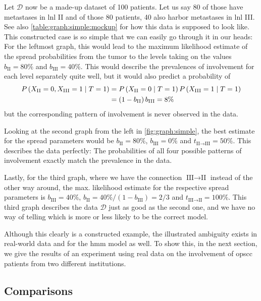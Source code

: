 \documentclass[\relativeRoot/main.tex]{subfiles}
\begin{document}
Let $\boldsymbol{\mathcal{D}}$ now be a made-up dataset of 100 patients. Let us say 80 of those have metastases in \gls{lnl} II and of those 80 patients, 40 also harbor metastases in \gls{lnl} III. See also \cref{table:graph:simple:mockup} for how this data is supposed to look like. This constructed case is so simple that we can easily go through it in our heads: For the leftmost graph, this would lead to the maximum likelihood estimate of the spread probabilities from the tumor to the levels taking on the values $b_\text{II} = 80\%$ and $b_\text{III} = 40\%$. This would describe the prevalences of involvement for each level separately quite well, but it would also predict a probability of
%
\begin{equation}
    \begin{aligned}
        P \left( X_\text{II}=0, X_\text{III}=1 \mid T=1 \right) &= P \left( X_\text{II}=0 \mid T=1 \right) P \left( X_\text{III}=1 \mid T=1 \right) \\
        &= \left( 1 - b_\text{II} \right) b_\text{III} = 8\%
    \end{aligned}
\end{equation}
%
but the corresponding pattern of involvement is never observed in the data.

Looking at the second graph from the left in \cref{fig:graph:simple}, the best estimate for the spread parameters would be $b_\text{II} = 80\%$, $b_\text{III} = 0\%$ and $t_{\text{II} \rightarrow \text{III}} = 50\%$. This describes the data perfectly: The probabilities of all four possible patterns of involvement exactly match the prevalence in the data.

Lastly, for the third graph, where we have the connection $\text{III} \rightarrow \text{II}$ instead of the other way around, the max. likelihood estimate for the respective spread parameters is $b_\text{III} = 40\%$, $b_\text{II} = 40\% / (1 - b_\text{III}) = 2/3$ and $t_{\text{III} \rightarrow \text{II}} = 100\%$. This third graph describes the data $\boldsymbol{\mathcal{D}}$ just as good as the second one, and we have no way of telling which is more or less likely to be the correct model.

Although this clearly is a constructed example, the illustrated ambiguity exists in real-world data and for the \gls{hmm} model as well. To show this, in the next section, we give the results of an experiment using real data on the involvement of \gls{opscc} patients from two different institutions.

\subsection{Comparisons}
\label{subsec:graph:simple:comp}
\end{document}
